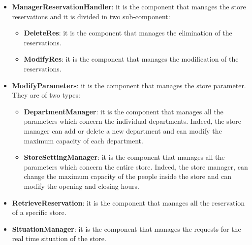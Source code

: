 \documentclass{article}
\begin{document}
			\begin{itemize}
				\item {\bfseries ManagerReservationHandler}: it is the component that manages the store reservations and it is divided in two sub-component:
				
				\begin{itemize}
					\item {\bfseries DeleteRes}: it is the component that manages the elimination of the reservations.
					\item {\bfseries ModifyRes}: it is the component that manages the modification of the reservations.
				\end{itemize}
				
				\item {\bfseries ModifyParameters}: it is the component that manages the store parameter. They are of two types:
				
				\begin{itemize}
					\item {\bfseries DepartmentManager}: it is the component that manages all the parameters which concern the individual departments. Indeed, the store manager can add or delete a new department and can modify the maximum capacity of each department.
					\item {\bfseries StoreSettingManager}: it is the component that manages all the parameters which concern the entire store. Indeed, the store manager, can change the maximum capacity of the people inside the store and can modify the opening and closing hours.
				\end{itemize}
			
				\item {\bfseries RetrieveReservation}: it is the component that manages all the reservation of a specific store.
				
				\item {\bfseries SituationManager}: it is the component that manages the requests for the real time situation of the store.
			\end{itemize}
		
\end{document}
